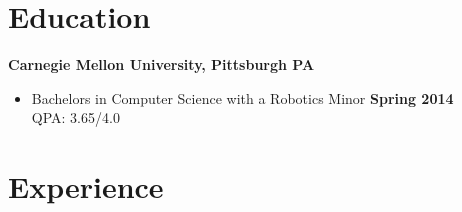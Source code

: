 \documentclass[sectioned]{dsyangres}
\begin{document}

\address{{\bf School Address} \\
  5032 Forbes Ave. SMC 4932 \\ Pittsburgh, PA 15289  \\
         }
\address{{\bf Home Address} \\
  5313 Betheny Circle \\
  Superior Township, MI 48198 \\
   }


\begin{resume}



\section{Education}

\textbf{Carnegie Mellon University, Pittsburgh PA}
  \begin{itemize}
    \item Bachelors in Computer Science with a Robotics Minor \hfill \textbf{ Spring 2014}
      \\ QPA: 3.65/4.0
  \end{itemize}



\section{Experience}


\end{resume}
\end{document}
